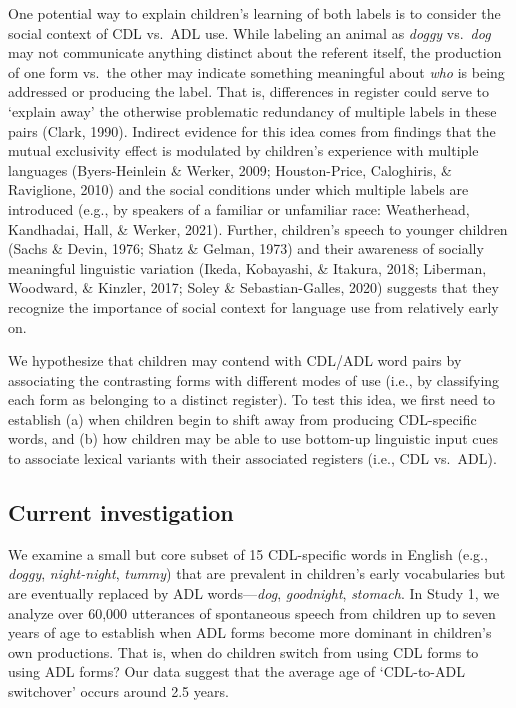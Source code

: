 \documentclass[10pt, letterpaper]{article}
\begin{document}
One potential way to explain children's learning of both labels is to
consider the social context of CDL vs.~ADL use. While labeling an animal
as \emph{doggy} vs.~\emph{dog} may not communicate anything distinct
about the referent itself, the production of one form vs.~the other may
indicate something meaningful about \emph{who} is being addressed or
producing the label. That is, differences in register could serve to
`explain away' the otherwise problematic redundancy of multiple labels
in these pairs (Clark, 1990). Indirect evidence for this idea comes from
findings that the mutual exclusivity effect is modulated by children's
experience with multiple languages (Byers-Heinlein \& Werker, 2009;
Houston-Price, Caloghiris, \& Raviglione, 2010) and the social
conditions under which multiple labels are introduced (e.g., by speakers
of a familiar or unfamiliar race: Weatherhead, Kandhadai, Hall, \&
Werker, 2021). Further, children's speech to younger children (Sachs \&
Devin, 1976; Shatz \& Gelman, 1973) and their awareness of socially
meaningful linguistic variation (Ikeda, Kobayashi, \& Itakura, 2018;
Liberman, Woodward, \& Kinzler, 2017; Soley \& Sebastian-Galles, 2020)
suggests that they recognize the importance of social context for
language use from relatively early on.

We hypothesize that children may contend with CDL/ADL word pairs by
associating the contrasting forms with different modes of use (i.e., by
classifying each form as belonging to a distinct register). To test this
idea, we first need to establish (a) when children begin to shift away
from producing CDL-specific words, and (b) how children may be able to
use bottom-up linguistic input cues to associate lexical variants with
their associated registers (i.e., CDL vs.~ADL).

\hypertarget{current-investigation}{%
\subsection{Current investigation}\label{current-investigation}}

We examine a small but core subset of 15 CDL-specific words in English
(e.g., \emph{doggy}, \emph{night-night}, \emph{tummy}) that are
prevalent in children's early vocabularies but are eventually replaced
by ADL words---\emph{dog}, \emph{goodnight}, \emph{stomach}. In Study 1,
we analyze over 60,000 utterances of spontaneous speech from children up
to seven years of age to establish when ADL forms become more dominant
in children's own productions. That is, when do children switch from
using CDL forms to using ADL forms? Our data suggest that the average
age of `CDL-to-ADL switchover' occurs around 2.5 years.
\end{document}
